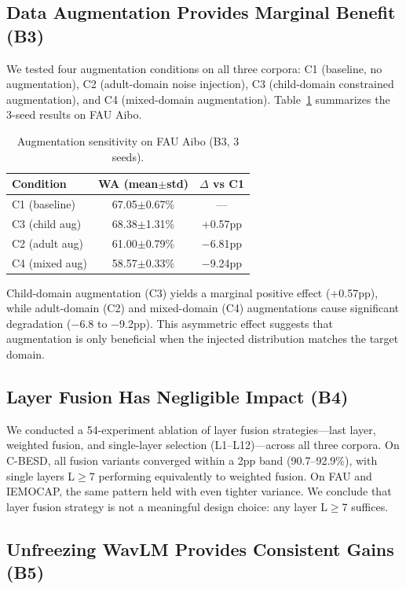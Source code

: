 \subsection{Data Augmentation Provides Marginal Benefit (B3)}

We tested four augmentation conditions on all three corpora: C1 (baseline, no augmentation), C2 (adult-domain noise injection), C3 (child-domain constrained augmentation), and C4 (mixed-domain augmentation). Table~\ref{tab:b3} summarizes the 3-seed results on FAU Aibo.

\begin{table}[h]
\centering
\caption{Augmentation sensitivity on FAU Aibo (B3, 3 seeds).}
\label{tab:b3}
\begin{tabular}{lcc}
\toprule
\textbf{Condition} & \textbf{WA (mean$\pm$std)} & \textbf{$\Delta$ vs C1} \\
\midrule
C1 (baseline)  & 67.05$\pm$0.67\% & --- \\
C3 (child aug) & 68.38$\pm$1.31\% & +0.57pp \\
C2 (adult aug) & 61.00$\pm$0.79\% & $-$6.81pp \\
C4 (mixed aug) & 58.57$\pm$0.33\% & $-$9.24pp \\
\bottomrule
\end{tabular}
\end{table}

Child-domain augmentation (C3) yields a marginal positive effect (+0.57pp), while adult-domain (C2) and mixed-domain (C4) augmentations cause significant degradation ($-$6.8 to $-$9.2pp). This asymmetric effect suggests that augmentation is only beneficial when the injected distribution matches the target domain.

\subsection{Layer Fusion Has Negligible Impact (B4)}

We conducted a 54-experiment ablation of layer fusion strategies---last layer, weighted fusion, and single-layer selection (L1--L12)---across all three corpora. On C-BESD, all fusion variants converged within a 2pp band (90.7--92.9\%), with single layers L$\geq$7 performing equivalently to weighted fusion. On FAU and IEMOCAP, the same pattern held with even tighter variance. We conclude that layer fusion strategy is not a meaningful design choice: any layer L$\geq$7 suffices.

\subsection{Unfreezing WavLM Provides Consistent Gains (B5)}

